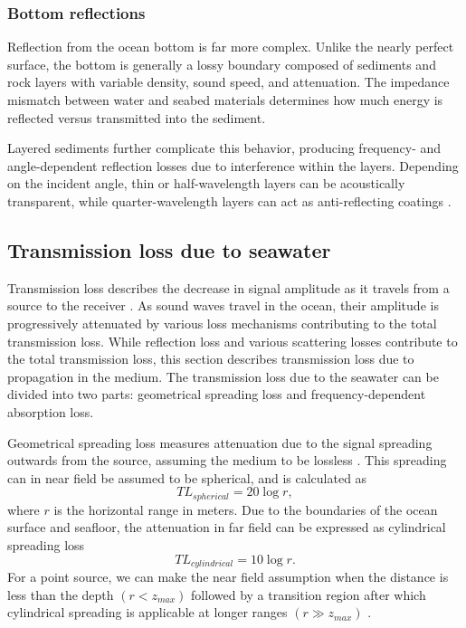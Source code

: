\documentclass[fleqn]{jaes}
\begin{document}
\subsubsection{Bottom reflections}
Reflection from the ocean bottom is far more complex. Unlike the nearly perfect surface, the bottom is generally a lossy boundary composed of sediments and rock layers with variable density, sound speed, and attenuation. The impedance mismatch between water and seabed materials determines how much energy is reflected versus transmitted into the sediment.

Layered sediments further complicate this behavior, producing frequency- and angle-dependent reflection losses due to interference within the layers. Depending on the incident angle, thin or half-wavelength layers can be acoustically transparent, while quarter-wavelength layers can act as anti-reflecting coatings \cite{Jensen}.

\subsection{Transmission loss due to seawater}
\label{sub:transmissionloss}
Transmission loss describes the decrease in signal amplitude as it travels from a source to the receiver \cite{Jensen}. As sound waves travel in the ocean, their amplitude is progressively attenuated by various loss mechanisms contributing to the total transmission loss. While reflection loss and various scattering losses contribute to the total transmission loss, this section describes transmission loss due to propagation in the medium. The transmission loss due to the seawater can be divided into two parts: geometrical spreading loss and frequency-dependent absorption loss.

Geometrical spreading loss measures attenuation due to the signal spreading outwards from the source, assuming the medium to be lossless \cite{Jensen}. This spreading can in near field be assumed to be spherical, and is calculated as
\begin{equation}
    TL_{spherical}=20\log r,
\end{equation}
where $r$ is the horizontal range in meters. Due to the boundaries of the ocean surface and seafloor, the attenuation in far field can be expressed as  cylindrical spreading loss
\begin{equation}
    TL_{cylindrical}=10\log r.
\end{equation}
For a point source, we can make the near field assumption when the distance is less than the depth $(r<z_{max})$ followed by a transition region after which cylindrical spreading is applicable at longer ranges $(r\gg z_{max})$ \cite{Jensen}.
\end{document}
